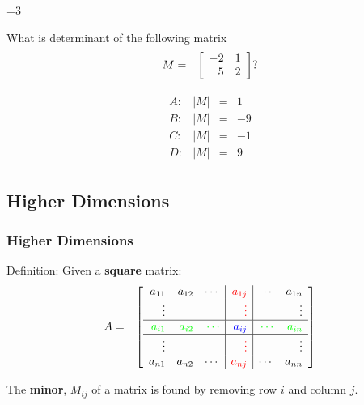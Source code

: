 {\begin{frame}
{          \vfill


     }\fi

      \ifnum\value{clickerQuiz}=3{%
        \vfill
      What is determinant of the following matrix
        \begin{eqnarray*}
          M & = & \left[ \begin{array}{rr} -2 & 1 \\ 5 & 2 \end{array} \right]?
        \end{eqnarray*}

        \begin{eqnarray*}
          \begin{array}{llcr}
            A: & |M| &  = &  1 \\ 
            B: & |M| &  = & -9 \\ 
            C: & |M| &  = &  -1 \\
            D: & |M| &  = & 9
          \end{array}
        \end{eqnarray*}

          \vfill


     }\fi

    \vfill
    \vfill
    \vfill

\end{frame}

}



\subsection{Higher Dimensions}

\begin{frame}
  \frametitle{Higher Dimensions}

  Definition: Given a \textbf{square} matrix:
  \begin{eqnarray*}
    A & = & 
    \left[
      \begin{array}{rrr|r|rr}
        a_{11} & a_{12} & \cdots & {\color{red}a_{1j}}  & \cdots & a_{1n} \\
        \vdots &       &       & {\color{red}\vdots} &        & \vdots \\ \hline
        {\color{green}a_{i1}} & {\color{green}a_{i2}}  & {\color{green}\cdots} & {\color{blue}a_{ij}} & {\color{green}\cdots} & {\color{green}a_{in}} \\ \hline
        \vdots &       &       & {\color{red}\vdots} &        & \vdots \\
        a_{n1} & a_{n2} & \cdots & {\color{red}a_{nj}}  & \cdots & a_{nn} \\
      \end{array}
    \right]
  \end{eqnarray*}

  The \textbf{minor}, $M_{ij}$ of a matrix is found by removing row
  $i$ and column $j$.

\end{frame}


